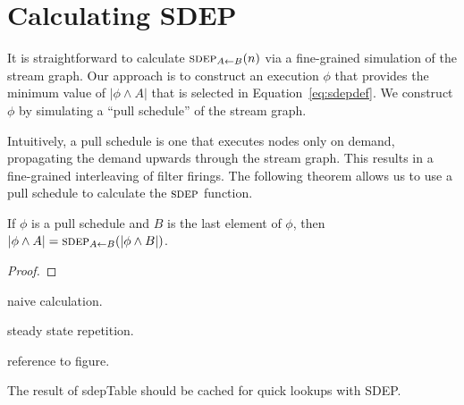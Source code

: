 \section{Calculating SDEP}

It is straightforward to calculate $\sdepf{A}{B}(n)$ via a
fine-grained simulation of the stream graph.  Our approach is to
construct an execution $\phi$ that provides the minimum value of
$|\phi \wedge A|$ that is selected in Equation~\ref{eq:sdepdef}.  We
construct $\phi$ by simulating a ``pull schedule'' of the stream
graph.

Intuitively, a pull schedule is one that executes nodes only on
demand, propagating the demand upwards through the stream graph.  This
results in a fine-grained interleaving of filter firings.  The
following theorem allows us to use a pull schedule to calculate the
$\textsc{sdep}$ function.
\begin{theorem}  If $\phi$ is a pull schedule and $B$ is the last element 
of $\phi$, then $|\phi \wedge A| = \sdepf{A}{B}(|\phi \wedge B|)$.
\end{theorem}
\begin{proof}
\end{proof}

naive calculation.

steady state repetition.

reference to figure.

The result of sdepTable should be cached for quick lookups with SDEP.


